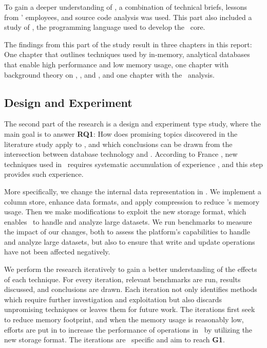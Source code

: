
To gain a deeper understanding of \gap, a combination of technical briefs, lessons from \genus' employees, and source code analysis was used.  This part also included a study of \delphi, the programming language used to develop the \gap~core.

The findings from this part of the study result in three chapters in this report: One chapter that outlines techniques used by in-memory, analytical databases that enable high performance and low memory usage, one chapter with background theory on \mde, \bd, and \delphi, and one chapter with the \gap~analysis.

\subsection{Design and Experiment}
\label{sub:Design and Experiment}
The second part of the research is a design and experiment type study, where the main goal is to answer \textbf{RQ1}: How does promising topics discovered in the literature study apply to \gap, and which conclusions can be drawn from the intersection between database technology and \mde. According to France \ea, new techniques used in \mde~requires systematic accumulation of experience \cite{France2007-ae}, and this step provides such experience.

More specifically, we change the internal data representation in \gap. We implement a column store, enhance data formats, and apply compression to reduce \gap's memory usage. Then we make modifications to exploit the new storage format, which enables \gap~to handle and analyze large datasets. We run benchmarks to measure the impact of our changes, both to assess the platform's capabilities to handle and analyze large datasets, but also to ensure that write and update operations have not been affected negatively. 

We perform the research iteratively to gain a better understanding of the effects of each technique. For every iteration, relevant benchmarks are run, results discussed, and conclusions are drawn. Each iteration not only identifies methods which require further investigation and exploitation but also discards unpromising techniques or leaves them for future work. The iterations first seek to reduce memory footprint, and when the memory usage is reasonably low, efforts are put in to increase the performance of operations in \gap~by utilizing the new storage format. The iterations are \gap~specific and aim to reach \textbf{G1}. 

